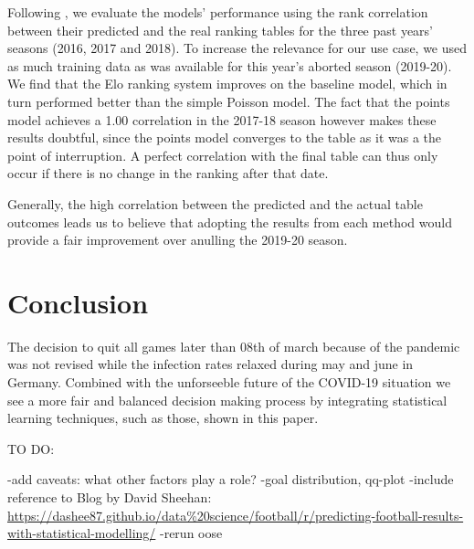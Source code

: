 \documentclass[12pt,a4paper]{article}
\begin{document}
Following \textcite{leitner2010}, we evaluate the models' performance
using the rank correlation between their predicted and the real ranking
tables for the three past years' seasons (2016, 2017 and 2018). To
increase the relevance for our use case, we used as much training data
as was available for this year's aborted season (2019-20). We find that
the Elo ranking system improves on the baseline model, which in turn
performed better than the simple Poisson model. The fact that the points
model achieves a 1.00 correlation in the 2017-18 season however makes
these results doubtful, since the points model converges to the table as
it was a the point of interruption. A perfect correlation with the final
table can thus only occur if there is no change in the ranking after
that date.

Generally, the high correlation between the predicted and the actual
table outcomes leads us to believe that adopting the results from each
method would provide a fair improvement over anulling the 2019-20
season.





\hypertarget{conclusion}{%
\section{Conclusion}\label{conclusion}}

The decision to quit all games later than 08th of march because of the
pandemic was not revised while the infection rates relaxed during may
and june in Germany. Combined with the unforseeble future of the
COVID-19 situation we see a more fair and balanced decision making
process by integrating statistical learning techniques, such as those,
shown in this paper.

TO DO:

-add caveats: what other factors play a role? -goal distribution,
qq-plot -include reference to Blog by David Sheehan:
\url{https://dashee87.github.io/data\%20science/football/r/predicting-football-results-with-statistical-modelling/}
-rerun oose

\newpage

\printbibliography
\end{document}
